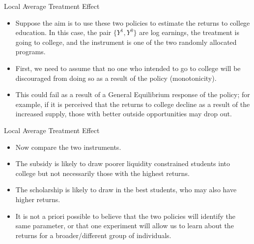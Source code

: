 \begin{frame}{Local Average Treatment Effect}
\begin{itemize}
\item Suppose the aim is to use these two policies to estimate the returns to college education. In this case, the pair $\{Y^1, Y^0\}$ are log earnings, the treatment is going to college, and the instrument is one of the two randomly allocated programs.
\item First, we need to assume that no one who intended to go to college will be discouraged from doing so as a result of the policy (monotonicity).
\item This could fail as a result of a General Equilibrium response of the policy; for example, if it is perceived that the returns to college decline as a result of the increased supply, those with better outside opportunities may drop out.
\end{itemize}
\end{frame}

\begin{frame}{Local Average Treatment Effect}
\begin{itemize}
\item Now compare the two instruments.
\item The subsidy is likely to draw poorer liquidity constrained students into college but not necessarily those with the highest returns.
\item The scholarship is likely to draw in the best students, who may also have higher returns.
\item It is not a priori possible to believe that the two policies will identify the same parameter, or that one experiment will allow us to learn about the returns for a broader/different group of individuals.
\end{itemize}
\end{frame}


